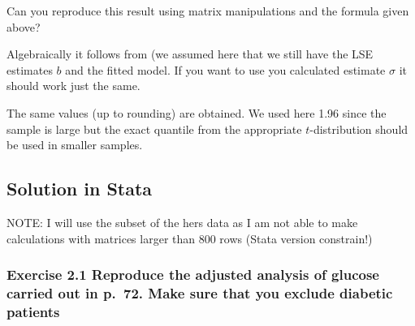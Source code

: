 \documentclass[
  letterpaper,
  DIV=11,
  numbers=noendperiod]{scrreprt}
\newenvironment{Shaded}{\begin{snugshade}}{\end{snugshade}}
\newcommand{\DecValTok}[1]{\textcolor[rgb]{0.68,0.00,0.00}{#1}}
\newcommand{\DocumentationTok}[1]{\textcolor[rgb]{0.37,0.37,0.37}{\textit{#1}}}
\newcommand{\FloatTok}[1]{\textcolor[rgb]{0.68,0.00,0.00}{#1}}
\newcommand{\FunctionTok}[1]{\textcolor[rgb]{0.28,0.35,0.67}{#1}}
\newcommand{\NormalTok}[1]{\textcolor[rgb]{0.00,0.23,0.31}{#1}}
\newcommand{\OtherTok}[1]{\textcolor[rgb]{0.00,0.23,0.31}{#1}}
\newcommand{\SpecialCharTok}[1]{\textcolor[rgb]{0.37,0.37,0.37}{#1}}
\begin{document}
Can you reproduce this result using matrix manipulations and the formula
given above?

Algebraically it follows from (we assumed here that we still have the
LSE estimates \(b\) and the fitted model. If you want to use you
calculated estimate \(\hat\sigma\) it should work just the same.

\begin{Shaded}
\end{Shaded}

The same values (up to rounding) are obtained. We used here 1.96 since
the sample is large but the exact quantile from the appropriate
\(t\)-distribution should be used in smaller samples.

\subsection{\texorpdfstring{\textbf{Solution in
Stata}}{Solution in Stata}}\label{solution-in-stata}

NOTE: I will use the subset of the hers data as I am not able to make
calculations with matrices larger than 800 rows (Stata version
constrain!)

\subsubsection*{Exercise 2.1 Reproduce the adjusted analysis of glucose
carried out in p.~72. Make sure that you exclude diabetic
patients}\label{exercise-2.1-reproduce-the-adjusted-analysis-of-glucose-carried-out-in-p.-72.-make-sure-that-you-exclude-diabetic-patients-1}
\end{document}
